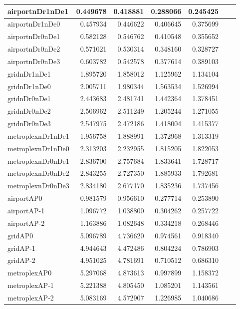 \begin{longtable}{|l|r|r|r|r|r|r|}
\endlastfoot
airportnDr1nDe1 & 0.449678 & 0.418881 & 0.288066 & 0.245425 \\ \hline
airportnDr1nDe0 & 0.457934 & 0.446622 & 0.406645 & 0.375699 \\ \hline
airportnDr0nDe1 & 0.582128 & 0.546762 & 0.410548 & 0.355652 \\ \hline
airportnDr0nDe2 & 0.571021 & 0.530314 & 0.348160 & 0.328727 \\ \hline
airportnDr0nDe3 & 0.603782 & 0.542578 & 0.377614 & 0.389103 \\ \hline
gridnDr1nDe1 & 1.895720 & 1.858012 & 1.125962 & 1.134104 \\ \hline
gridnDr1nDe0 & 2.005711 & 1.980344 & 1.563534 & 1.526994 \\ \hline
gridnDr0nDe1 & 2.443683 & 2.481741 & 1.442364 & 1.378451 \\ \hline
gridnDr0nDe2 & 2.506962 & 2.511249 & 1.205244 & 1.271055 \\ \hline
gridnDr0nDe3 & 2.547975 & 2.472186 & 1.418004 & 1.415377 \\ \hline
metroplexnDr1nDe1 & 1.956758 & 1.888991 & 1.372968 & 1.313319 \\ \hline
metroplexnDr1nDe0 & 2.313203 & 2.232955 & 1.815205 & 1.822053 \\ \hline
metroplexnDr0nDe1 & 2.836700 & 2.757684 & 1.833641 & 1.728717 \\ \hline
metroplexnDr0nDe2 & 2.843255 & 2.727350 & 1.885933 & 1.792681 \\ \hline
metroplexnDr0nDe3 & 2.834180 & 2.677170 & 1.835236 & 1.737456 \\ \hline
airportAP0 & 0.981579 & 0.956610 & 0.277714 & 0.253890 \\ \hline
airportAP-1 & 1.096772 & 1.038800 & 0.304262 & 0.257722 \\ \hline
airportAP-2 & 1.163886 & 1.082648 & 0.334218 & 0.268446 \\ \hline
gridAP0 & 5.096789 & 4.736620 & 0.974561 & 0.918340 \\ \hline
gridAP-1 & 4.944643 & 4.472486 & 0.804224 & 0.786903 \\ \hline
gridAP-2 & 4.951025 & 4.781691 & 0.710512 & 0.686310 \\ \hline
metroplexAP0 & 5.297068 & 4.873613 & 0.997899 & 1.158372 \\ \hline
metroplexAP-1 & 5.221388 & 4.805450 & 1.085201 & 1.143561 \\ \hline
metroplexAP-2 & 5.083169 & 4.572907 & 1.226985 & 1.040686 \\ \hline

\end{longtable}
